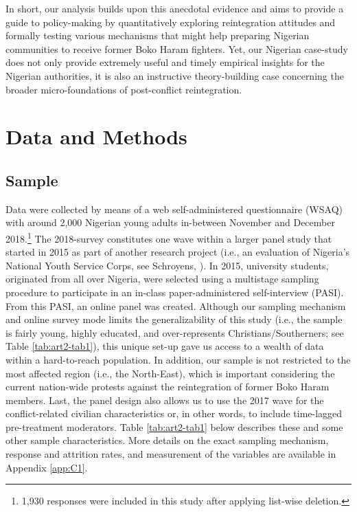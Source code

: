In short, our analysis builds upon this anecdotal evidence and aims to provide a guide to policy-making by quantitatively exploring reintegration attitudes and formally testing various mechanisms that might help preparing Nigerian communities to receive former Boko Haram fighters. Yet, our Nigerian case-study does not only provide extremely useful and timely empirical insights for the Nigerian authorities, it is also an instructive theory-building case concerning the broader micro-foundations of post-conflict reintegration.


\section{Data and Methods}
\subsection{Sample}
Data were collected by means of a web self-administered questionnaire (WSAQ) with around 2,000 Nigerian young adults in-between November and December 2018.\footnote{1,930 responses were included in this study after applying list-wise deletion.} The 2018-survey constitutes one wave within a larger panel study that started in 2015 as part of another research project (i.e., an evaluation of Nigeria's National Youth Service Corps, see Schroyens, \citeyear{Schroyens2019}). In 2015, university students, originated from all over Nigeria, were selected using a multistage sampling procedure to participate in an in-class paper-administered self-interview (PASI). From this PASI, an online panel was created. Although our sampling mechanism and online survey mode limits the generalizability of this study (i.e., the sample is fairly young, highly educated, and over-represents Christians/Southerners; see Table \ref{tab:art2-tab1}), this unique set-up gave us access to a wealth of data within a hard-to-reach population. In addition, our sample is not restricted to the most affected region (i.e., the North-East), which is important considering the current nation-wide protests against the reintegration of former Boko Haram members. Last, the panel design also allows us to use the 2017 wave for the conflict-related civilian characteristics or, in other words, to include time-lagged pre-treatment moderators. Table \ref{tab:art2-tab1} below describes these and some other sample characteristics. More details on the exact sampling mechanism, response and attrition rates, and measurement of the variables are available in Appendix \ref{app:C1}.

